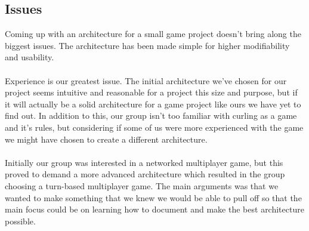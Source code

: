 \subsection{Issues}

Coming up with an architecture for a small game project doesn’t bring along the biggest issues. The architecture has been made simple for higher modifiability and usability. \\
\\
Experience is our greatest issue. The initial architecture we’ve chosen for our project seems intuitive and reasonable for a project this size and purpose, but if it will actually be a solid architecture for a game project like ours we have yet to find out. In addition to this, our group isn’t too familiar with curling as a game and it’s rules, but considering if some of us were more experienced with the game we might have chosen to create a different architecture.\\ 
\\
Initially our group was interested in a networked multiplayer game, but this proved to demand a more advanced architecture which resulted in the group choosing a turn-based multiplayer game. The main arguments was that we wanted to make something that we knew we would be able to pull off so that the main focus could be on learning how to document and make the best architecture possible.\\
